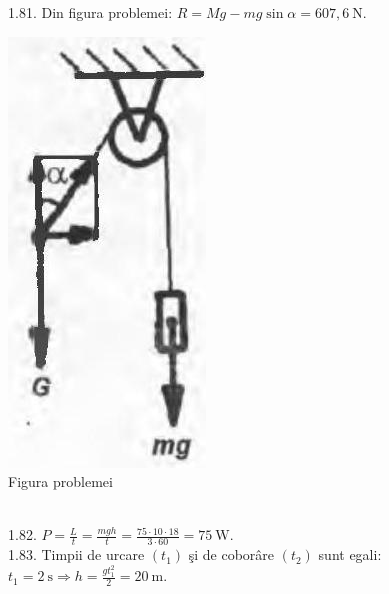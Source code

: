 1.81. Din figura problemei: $R=M g-m g \sin \alpha=607,6 \mathrm{~N}$.\\ \begin{center} \includegraphics[width=0.4\linewidth]{images/2025_07_01_5b3ff9fa0d508c8e9f17g-213(2)}\\ Figura problemei \end{center}\\

1.82. $P=\frac{L}{t}=\frac{m g h}{t}=\frac{75 \cdot 10 \cdot 18}{3 \cdot 60}=75 \mathrm{~W}$.\\

1.83. Timpii de urcare $\left(t_{1}\right)$ şi de coborâre $\left(t_{2}\right)$ sunt egali:\\ $t_{1}=2 \mathrm{~s} \Rightarrow h=\frac{g t_{1}^{2}}{2}=20 \mathrm{~m}$.\\

